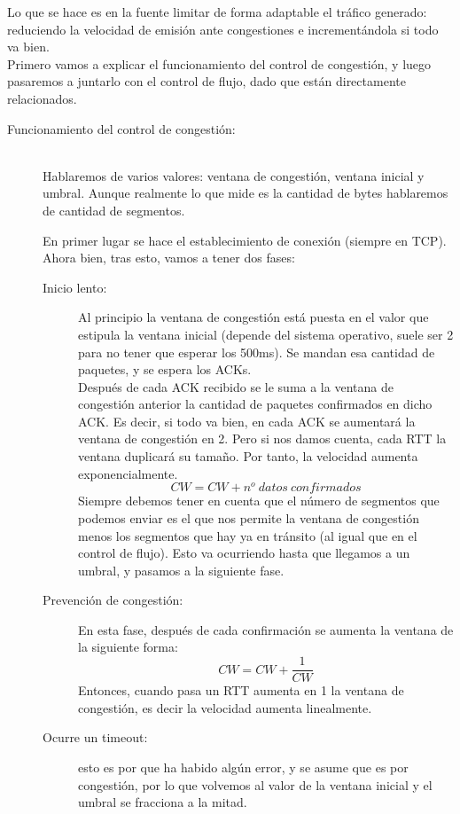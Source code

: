 Lo que se hace es en la fuente limitar de forma adaptable el tráfico generado: reduciendo la velocidad de emisión ante congestiones e incrementándola si todo va bien. \\

Primero vamos a explicar el funcionamiento del control de congestión, y luego pasaremos a juntarlo con el control de flujo, dado que están directamente relacionados.

\begin{description}
    \item [Funcionamiento del control de congestión:]~\\
Hablaremos de varios valores: ventana de congestión, ventana inicial y umbral. Aunque realmente lo que mide es la cantidad de bytes hablaremos de cantidad de segmentos. 

En primer lugar se hace el establecimiento de conexión (siempre en TCP). Ahora bien, tras esto, vamos a tener dos fases:
\begin{description}
    \item [Inicio lento:] Al principio la ventana de congestión está puesta en el valor que estipula la ventana inicial (depende del sistema operativo, suele ser 2 para no tener que esperar los \unit{500}{ms}). Se mandan esa cantidad de paquetes, y se espera los ACKs. \\

        Después de cada ACK recibido se le suma a la ventana de congestión anterior la cantidad de paquetes confirmados en dicho ACK. Es decir, si todo va bien, en cada ACK se aumentará la ventana de congestión en 2. Pero si nos damos cuenta, cada \acrshort{RTT} la ventana duplicará su tamaño. Por tanto, la velocidad aumenta exponencialmente.
        \begin{equation*}
            CW = CW + n^o \ datos \ confirmados
        \end{equation*}
        Siempre debemos tener en cuenta que el número de segmentos que podemos enviar es el que nos permite la ventana de congestión menos los segmentos que hay ya en tránsito (al igual que en el control de flujo). 
        Esto va ocurriendo hasta que llegamos a un umbral, y pasamos a la siguiente fase.
    \item [Prevención de congestión:] En esta fase, después de cada confirmación se aumenta la ventana de la siguiente forma:
        \begin{equation*}
            CW = CW + \frac{1}{CW}
        \end{equation*}
        Entonces, cuando pasa un \acrshort{RTT} aumenta en 1 la ventana de congestión, es decir la velocidad aumenta linealmente. 
    \item [Ocurre un timeout:] esto es por que ha habido algún error, y se asume que es por congestión, por lo que volvemos al valor de la ventana inicial y el umbral se fracciona a la mitad. 
\end{description}


\end{description}
